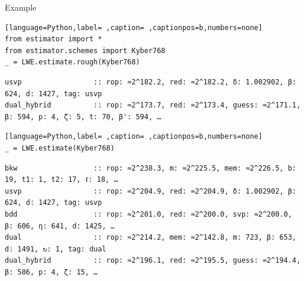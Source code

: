 \documentclass[table,10pt,aspectratio=169]{beamer}
\begin{document}
\begin{frame}[label={sec:org3004887},fragile]{Example}
 \begin{lstlisting}[language=Python,label= ,caption= ,captionpos=b,numbers=none]
from estimator import *
from estimator.schemes import Kyber768
_ = LWE.estimate.rough(Kyber768)
\end{lstlisting}

\begin{verbatim}
usvp                 :: rop: ≈2^182.2, red: ≈2^182.2, δ: 1.002902, β: 624, d: 1427, tag: usvp
dual_hybrid          :: rop: ≈2^173.7, red: ≈2^173.4, guess: ≈2^171.1, β: 594, p: 4, ζ: 5, t: 70, β': 594, …
\end{verbatim}


\begin{lstlisting}[language=Python,label= ,caption= ,captionpos=b,numbers=none]
_ = LWE.estimate(Kyber768)
\end{lstlisting}

\begin{verbatim}
bkw                  :: rop: ≈2^238.3, m: ≈2^225.5, mem: ≈2^226.5, b: 19, t1: 1, t2: 17, ℓ: 18, …
usvp                 :: rop: ≈2^204.9, red: ≈2^204.9, δ: 1.002902, β: 624, d: 1427, tag: usvp
bdd                  :: rop: ≈2^201.0, red: ≈2^200.0, svp: ≈2^200.0, β: 606, η: 641, d: 1425, …
dual                 :: rop: ≈2^214.2, mem: ≈2^142.8, m: 723, β: 653, d: 1491, ↻: 1, tag: dual
dual_hybrid          :: rop: ≈2^196.1, red: ≈2^195.5, guess: ≈2^194.4, β: 586, p: 4, ζ: 15, …
\end{verbatim}
\end{frame}
\end{document}
